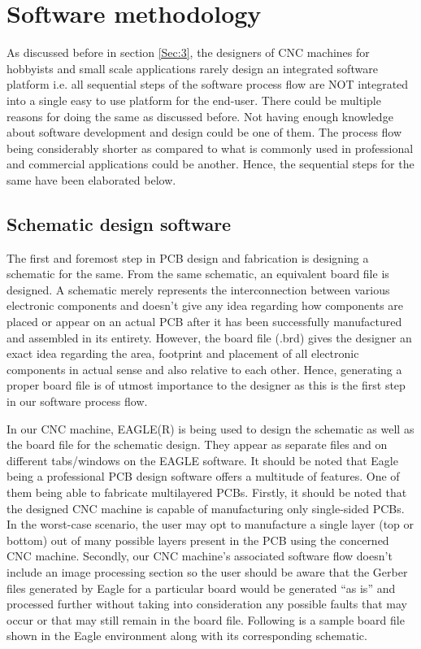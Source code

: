 \chapter{Software methodology} \label{chapter5}

As discussed before in section \ref{Sec:3}, the designers of CNC machines for hobbyists and small scale applications rarely design an integrated software platform i.e. all sequential steps of the software process flow are NOT integrated into a single easy to use platform for the end-user. There could be multiple reasons for doing the same as discussed before. Not having enough knowledge about software development and design could be one of them. The process flow being considerably shorter as compared to what is commonly used in professional and commercial applications could be another. Hence, the sequential steps for the same have been elaborated below.

\section{Schematic design software}

The first and foremost step in PCB design and fabrication is designing a schematic for the same. From the same schematic, an equivalent board file is designed. A schematic merely represents the interconnection between various electronic components and doesn’t give any idea regarding how components are placed or appear on an actual PCB after it has been successfully manufactured and assembled in its entirety. However, the board file (.brd) gives the designer an exact idea regarding the area, footprint and placement of all electronic components in actual sense and also relative to each other. Hence, generating a proper board file is of utmost importance to the designer as this is the first step in our software process flow. \par

In our CNC machine, EAGLE(R) is being used to design the schematic as well as the board file for the schematic design. They appear as separate files and on different tabs/windows on the EAGLE software.  It should be noted that Eagle being a professional PCB design software offers a multitude of features. One of them being able to fabricate multilayered PCBs. Firstly, it should be noted that the designed CNC machine is capable of manufacturing only single-sided PCBs. In the worst-case scenario, the user may opt to manufacture a single layer (top or bottom) out of many possible layers present in the PCB using the concerned CNC machine. Secondly, our CNC machine’s associated software flow doesn’t include an image processing section so the user should be aware that the Gerber files generated by Eagle for a particular board would be generated “as is” and processed further without taking into consideration any possible faults that may occur or that may still remain in the board file. Following is a sample board file shown in the Eagle environment along with its corresponding schematic. \par


